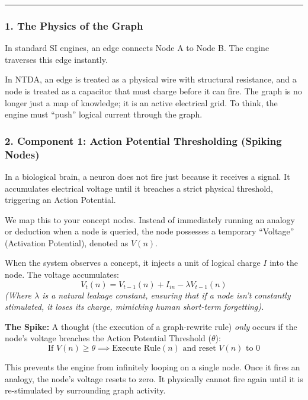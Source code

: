 \documentclass[
  11pt,
  a4paper,
]{article}
\begin{document}
\begin{center}\rule{0.5\linewidth}{0.5pt}\end{center}

\subsubsection{1. The Physics of the
Graph}\label{the-physics-of-the-graph}

In standard SI engines, an edge connects Node A to Node B. The engine
traverses this edge instantly.

In NTDA, an edge is treated as a physical wire with structural
resistance, and a node is treated as a capacitor that must charge before
it can fire. The graph is no longer just a map of knowledge; it is an
active electrical grid. To think, the engine must ``push'' logical
current through the graph.

\subsubsection{2. Component 1: Action Potential Thresholding (Spiking
Nodes)}\label{component-1-action-potential-thresholding-spiking-nodes}

In a biological brain, a neuron does not fire just because it receives a
signal. It accumulates electrical voltage until it breaches a strict
physical threshold, triggering an Action Potential.

We map this to your concept nodes. Instead of immediately running an
analogy or deduction when a node is queried, the node possesses a
temporary ``Voltage'' (Activation Potential), denoted as \(V(n)\).

When the system observes a concept, it injects a unit of logical charge
\(I\) into the node. The voltage accumulates:
\[ V_t(n) = V_{t-1}(n) + I_{in} - \lambda V_{t-1}(n) \] \emph{(Where
\(\lambda\) is a natural leakage constant, ensuring that if a node isn't
constantly stimulated, it loses its charge, mimicking human short-term
forgetting).}

\textbf{The Spike:} A thought (the execution of a graph-rewrite rule)
\emph{only} occurs if the node's voltage breaches the Action Potential
Threshold (\(\theta\)):
\[ \text{If } V(n) \ge \theta \implies \text{Execute Rule}(n) \text{ and reset } V(n) \text{ to } 0 \]

This prevents the engine from infinitely looping on a single node. Once
it fires an analogy, the node's voltage resets to zero. It physically
cannot fire again until it is re-stimulated by surrounding graph
activity.
\end{document}
